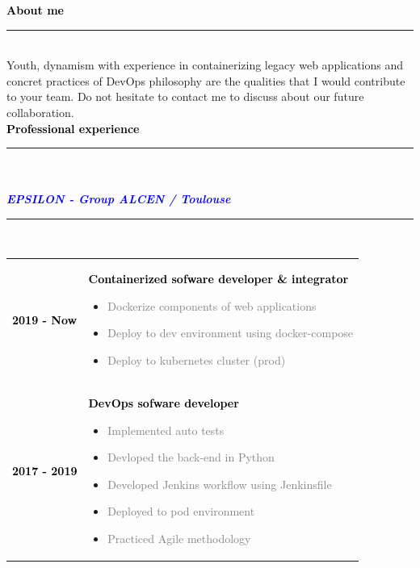 \documentclass[12pt,A4]{article}
\begin{document}
\begin{minipage}[t]{0.68\textwidth}
%
%
\textcolor{black}{\large \bf About me \vspace{-5pt}\\}
\noindent\textcolor{blue}{\rule{13cm}{.8mm}}\\
%
\hspace*{5mm}
Youth, dynamism with experience in containerizing legacy web applications and concret practices of DevOps philosophy  are the qualities that I would contribute to your team.
Do not hesitate to contact me to discuss about our future collaboration.
%
%
\vspace*{1cm}\\
\textcolor{black}{\large \bf Professional experience \vspace{-5pt}\\}
\noindent\textcolor{blue}{\rule{13cm}{.8mm}}\\
%
\vspace*{-5pt}\\
\textcolor{blue}{\bf \textit{EPSILON - Group ALCEN / Toulouse}}\hfill\textcolor{gray!40}{\rule{5cm}{2mm}}\\
\begin{tabular}{P{2.5cm}p{10cm}}
\textcolor{black}{\bf 2019 - Now} & \textcolor{black}{\bf Containerized sofware developer \& integrator}
\begin{itemize}
  \item \small \textcolor{gray}{Dockerize components of web applications}
  \item \small \textcolor{gray}{Deploy to dev environment using docker-compose}
  \item \small \textcolor{gray}{Deploy to kubernetes cluster (prod)}
\end{itemize}\\
\textcolor{black}{\bf 2017 - 2019} & \textcolor{black}{\bf DevOps sofware developer}
\begin{itemize}
  \item \small \textcolor{gray}{Implemented auto tests}
  \item \small \textcolor{gray}{Devloped the back-end in Python}
  \item \small \textcolor{gray}{Developed Jenkins workflow using Jenkinsfile}
  \item \small \textcolor{gray}{Deployed to pod environment}
  \item \small \textcolor{gray}{Practiced Agile methodology}
\end{itemize}\\

\end{tabular}
\end{minipage}
\end{document}
